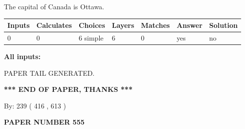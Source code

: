 \documentclass[12pt]{article}
\begin{document}
 
The capital of Canada is Ottawa.
 
 
\noindent{}
 
 
   
   
   
   
\noindent\begin{tabular}{|l|l|l|l|l|l|l|}
 \hline
Inputs & Calculates & Choices & Layers & Matches & Answer & Solution \\ \hline
 0  & 
 0  & 
 6
  simple  
  & 
 6  & 
 0  & 
  yes & 
  no 
  \\ \hline
 \end{tabular}
   
   
   
   
\noindent{}
   
   
   
   
\noindent\vspace{0.1in}\hspace{-0.08in} {\textbf{\Large{All inputs: }}}
   
   
   
   
   
   
 \vspace{0.2in}
 
   
   
\vspace{2.0in} PAPER TAIL GENERATED.
   
   
   
   
\vspace{1.0in} 
{\textbf{\large{ *** END OF PAPER, THANKS *** }}} 
   
   
\hspace{1.0in} By: 
 239 ( 416 ,  613 )
   
   
   
   
\newpage 
\setcounter{page}{ 
   555001 } 
   
   
   
   
 {\textbf{ \Large{ PAPER NUMBER  555  }}}
   
   
\vspace{0.2in}
   
   
   
   
   
   
   
\end{document}
